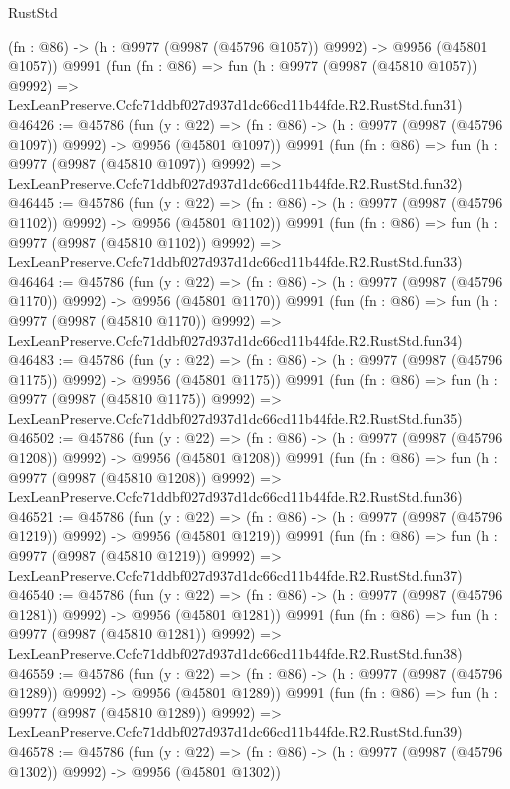 \begin{lexlean}{RustStd}
\begin{coremodule}
    (fn : @86) -> (h : @9977 (@9987 (@45796 @1057)) @9992) -> @9956 (@45801 @1057))
    @9991
    (fun (fn : @86) =>
    fun (h : @9977 (@9987 (@45810 @1057)) @9992) =>
    LexLeanPreserve.Ccfc71ddbf027d937d1dc66cd11b44fde.R2.RustStd.fun31)
@46426 := @45786
    (fun (y : @22) =>
    (fn : @86) -> (h : @9977 (@9987 (@45796 @1097)) @9992) -> @9956 (@45801 @1097))
    @9991
    (fun (fn : @86) =>
    fun (h : @9977 (@9987 (@45810 @1097)) @9992) =>
    LexLeanPreserve.Ccfc71ddbf027d937d1dc66cd11b44fde.R2.RustStd.fun32)
@46445 := @45786
    (fun (y : @22) =>
    (fn : @86) -> (h : @9977 (@9987 (@45796 @1102)) @9992) -> @9956 (@45801 @1102))
    @9991
    (fun (fn : @86) =>
    fun (h : @9977 (@9987 (@45810 @1102)) @9992) =>
    LexLeanPreserve.Ccfc71ddbf027d937d1dc66cd11b44fde.R2.RustStd.fun33)
@46464 := @45786
    (fun (y : @22) =>
    (fn : @86) -> (h : @9977 (@9987 (@45796 @1170)) @9992) -> @9956 (@45801 @1170))
    @9991
    (fun (fn : @86) =>
    fun (h : @9977 (@9987 (@45810 @1170)) @9992) =>
    LexLeanPreserve.Ccfc71ddbf027d937d1dc66cd11b44fde.R2.RustStd.fun34)
@46483 := @45786
    (fun (y : @22) =>
    (fn : @86) -> (h : @9977 (@9987 (@45796 @1175)) @9992) -> @9956 (@45801 @1175))
    @9991
    (fun (fn : @86) =>
    fun (h : @9977 (@9987 (@45810 @1175)) @9992) =>
    LexLeanPreserve.Ccfc71ddbf027d937d1dc66cd11b44fde.R2.RustStd.fun35)
@46502 := @45786
    (fun (y : @22) =>
    (fn : @86) -> (h : @9977 (@9987 (@45796 @1208)) @9992) -> @9956 (@45801 @1208))
    @9991
    (fun (fn : @86) =>
    fun (h : @9977 (@9987 (@45810 @1208)) @9992) =>
    LexLeanPreserve.Ccfc71ddbf027d937d1dc66cd11b44fde.R2.RustStd.fun36)
@46521 := @45786
    (fun (y : @22) =>
    (fn : @86) -> (h : @9977 (@9987 (@45796 @1219)) @9992) -> @9956 (@45801 @1219))
    @9991
    (fun (fn : @86) =>
    fun (h : @9977 (@9987 (@45810 @1219)) @9992) =>
    LexLeanPreserve.Ccfc71ddbf027d937d1dc66cd11b44fde.R2.RustStd.fun37)
@46540 := @45786
    (fun (y : @22) =>
    (fn : @86) -> (h : @9977 (@9987 (@45796 @1281)) @9992) -> @9956 (@45801 @1281))
    @9991
    (fun (fn : @86) =>
    fun (h : @9977 (@9987 (@45810 @1281)) @9992) =>
    LexLeanPreserve.Ccfc71ddbf027d937d1dc66cd11b44fde.R2.RustStd.fun38)
@46559 := @45786
    (fun (y : @22) =>
    (fn : @86) -> (h : @9977 (@9987 (@45796 @1289)) @9992) -> @9956 (@45801 @1289))
    @9991
    (fun (fn : @86) =>
    fun (h : @9977 (@9987 (@45810 @1289)) @9992) =>
    LexLeanPreserve.Ccfc71ddbf027d937d1dc66cd11b44fde.R2.RustStd.fun39)
@46578 := @45786
    (fun (y : @22) =>
    (fn : @86) -> (h : @9977 (@9987 (@45796 @1302)) @9992) -> @9956 (@45801 @1302))

\end{coremodule}
\end{lexlean}
